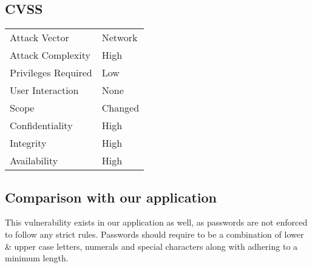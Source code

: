 \subsection{CVSS}
\begin{tabular}{l | l}
Attack Vector		& Network \\
Attack Complexity	& High \\
Privileges Required & Low \\
User Interaction	& None \\
Scope				& Changed \\
Confidentiality		& High \\
Integrity			& High \\
Availability		& High
\end{tabular}

\subsection{Comparison with our application}
This vulnerability exists in our application as well, as passwords are not enforced to follow any strict rules. Passwords should require to be a combination of lower \& upper case letters, numerals and special characters along with adhering to a minimum length.
\clearpage